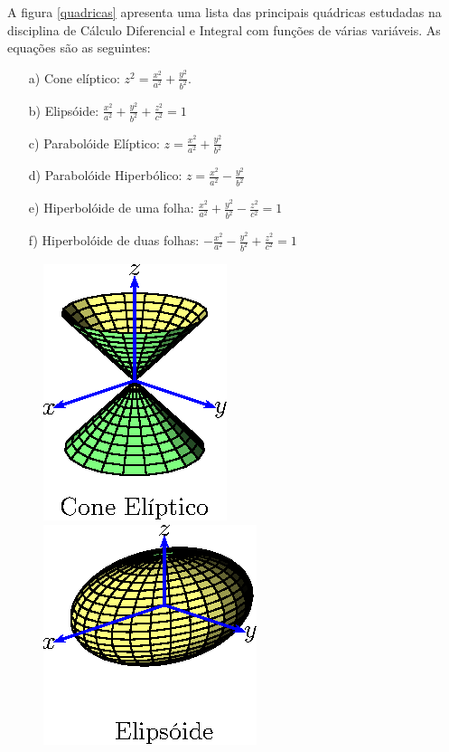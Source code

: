 \begin{ex}
A figura \ref{quadricas} apresenta uma lista das principais quádricas estudadas na disciplina de Cálculo Diferencial e Integral com funções de várias variáveis. As equações são as seguintes:
\begin{itemize}
\item[a)] Cone elíptico: $\displaystyle z^2=\frac{x^2}{a^2}+\frac{y^2}{b^2}$.
\item[b)] Elipsóide: $\displaystyle \frac{x^2}{a^2}+\frac{y^2}{b^2}+\frac{z^2}{c^2}=1$
\item[c)] Parabolóide Elíptico: $\displaystyle z=\frac{x^2}{a^2}+\frac{y^2}{b^2}$
\item[d)] Parabolóide Hiperbólico: $\displaystyle z=\frac{x^2}{a^2}-\frac{y^2}{b^2}$
\item[e)] Hiperbolóide de uma folha: $\displaystyle \frac{x^2}{a^2}+\frac{y^2}{b^2}-\frac{z^2}{c^2}=1$
\item[f)] Hiperbolóide de duas folhas:  $\displaystyle -\frac{x^2}{a^2}-\frac{y^2}{b^2}+\frac{z^2}{c^2}=1$
\end{itemize}
\begin{figure}[htp]
\includegraphics{cap_superficies/figs/figura_2}
\includegraphics{cap_superficies/figs/figura_3}

\end{figure}
\end{ex}
